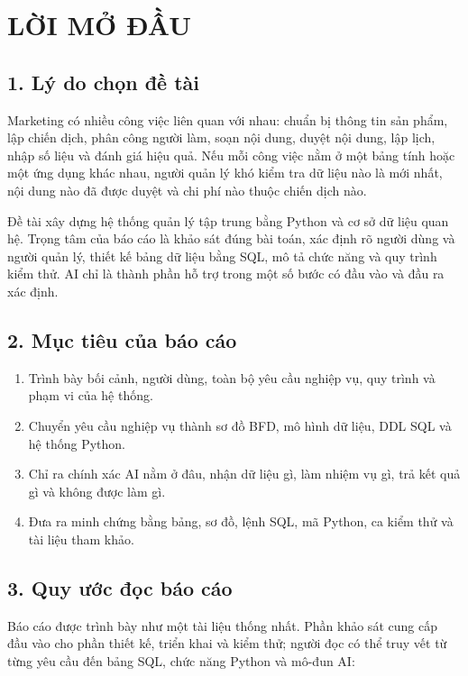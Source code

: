 \chapter*{LỜI MỞ ĐẦU}

\section*{1. Lý do chọn đề tài}

Marketing có nhiều công việc liên quan với nhau: chuẩn bị thông tin sản phẩm, lập chiến dịch, phân công người làm, soạn nội dung, duyệt nội dung, lập lịch, nhập số liệu và đánh giá hiệu quả. Nếu mỗi công việc nằm ở một bảng tính hoặc một ứng dụng khác nhau, người quản lý khó kiểm tra dữ liệu nào là mới nhất, nội dung nào đã được duyệt và chi phí nào thuộc chiến dịch nào.

Đề tài xây dựng hệ thống quản lý tập trung bằng Python và cơ sở dữ liệu quan hệ. Trọng tâm của báo cáo là khảo sát đúng bài toán, xác định rõ người dùng và người quản lý, thiết kế bảng dữ liệu bằng SQL, mô tả chức năng và quy trình kiểm thử. AI chỉ là thành phần hỗ trợ trong một số bước có đầu vào và đầu ra xác định.

\section*{2. Mục tiêu của báo cáo}
\begin{enumerate}
  \item Trình bày bối cảnh, người dùng, toàn bộ yêu cầu nghiệp vụ, quy trình và phạm vi của hệ thống.
  \item Chuyển yêu cầu nghiệp vụ thành sơ đồ BFD, mô hình dữ liệu, DDL SQL và hệ thống Python.
  \item Chỉ ra chính xác AI nằm ở đâu, nhận dữ liệu gì, làm nhiệm vụ gì, trả kết quả gì và không được làm gì.
  \item Đưa ra minh chứng bằng bảng, sơ đồ, lệnh SQL, mã Python, ca kiểm thử và tài liệu tham khảo.
\end{enumerate}

\section*{3. Quy ước đọc báo cáo}

Báo cáo được trình bày như một tài liệu thống nhất. Phần khảo sát cung cấp đầu vào cho phần thiết kế, triển khai và kiểm thử; người đọc có thể truy vết từ từng yêu cầu đến bảng SQL, chức năng Python và mô-đun AI:

